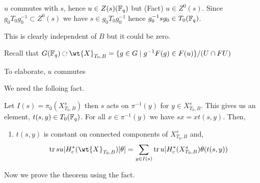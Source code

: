 \documentclass[12pt]{article}
\begin{document}
\begin{rmk}
$u$ commutes with $s$, hence $u \in Z(s)(\mathbb{F}_q)$ but (Fact) $u \in Z^0(s)$. Since $g_0 T_0 g_0^{-1} \subset Z^0(s)$ we have $s \in g_0 T_0 g_0^{-1}$ hence $g_0^{-1} s g_0 \in T_0(\mathbb{F}_q)$.
\end{rmk}

\begin{rmk}
This is clearly independent of $B$ but it could be zero.
\end{rmk}

\begin{theorem}
Recall that $G(\FF_q) \acts \wt{X}_{T_0, B} = \{ g \in G \mid g^{-1} F(g) \in F(u) \} / (U \cap F U)$
\end{theorem}

\begin{rmk}
To elaborate, $u$ commutes 


We need the folloing fact.
\end{rmk}

\begin{prop}
Let $I(s) = \pi_0(X^s_{T_0, B})$ then $s$ acts on $\pi^{-1}(y)$ for $y \in X^s_{T_0, B}$. This gives us an element, $t(s, y) \in T_0(\mathbb{F}_q)$. For all $x \in \pi^{-1}(y)$ we have $s x = x t(s,y)$. Then,
\begin{enumerate}
\item $t(s,y)$ is constant on connected components of $X^s_{T_0, B}$ and,
\[ \tr{su | H_c^*(\wt{X}_{T_0, B})[\theta]} = \sum_{y \in I(s)} \tr{u | H^*_c(X^s_{T_0, B})} \theta(t(s,y)) \]
\end{enumerate}
\end{prop}

Now we prove the theorem using the fact.
\end{document}
